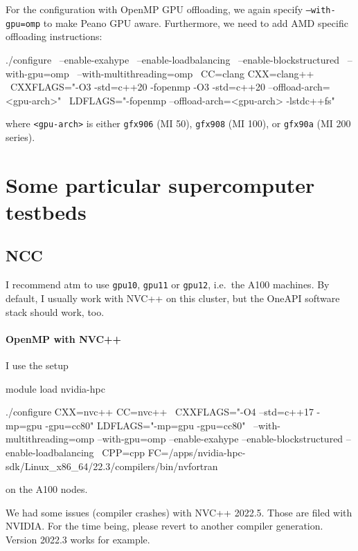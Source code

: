 For the configuration with OpenMP GPU offloading, we again specify \texttt{--with-gpu=omp} to make Peano GPU aware.
Furthermore, we need to add AMD specific offloading instructions:

\begin{bash}
  ./configure \
  --enable-exahype \
  --enable-loadbalancing \
  --enable-blockstructured \
  --with-gpu=omp \
  --with-multithreading=omp \
  CC=clang CXX=clang++ \
  CXXFLAGS="-O3 -std=c++20 -fopenmp -O3 -std=c++20 --offload-arch=<gpu-arch>" \
  LDFLAGS="-fopenmp --offload-arch=<gpu-arch> -lstdc++fs"
\end{bash}

where \texttt{<gpu-arch>} is either \texttt{gfx906} (MI 50), \texttt{gfx908} (MI 100), or \texttt{gfx90a} (MI 200 series).

\section{Some particular supercomputer testbeds}




\subsection{NCC}

I recommend atm to use \texttt{gpu10}, \texttt{gpu11} or \texttt{gpu12}, i.e.~the A100 machines.
By default, I usually work with NVC++ on this cluster, but the OneAPI software stack should work, too.

\paragraph{OpenMP with NVC++}

I use the setup 

\begin{bash}
module load nvidia-hpc

./configure CXX=nvc++ CC=nvc++ \ 
 CXXFLAGS="-O4 --std=c++17 -mp=gpu -gpu=cc80" LDFLAGS="-mp=gpu -gpu=cc80" \ 
 --with-multithreading=omp --with-gpu=omp --enable-exahype --enable-blockstructured --enable-loadbalancing \ 
 CPP=cpp FC=/apps/nvidia-hpc-sdk/Linux_x86_64/22.3/compilers/bin/nvfortran 
\end{bash}

\noindent
on the A100 nodes.

\begin{remark}
 We had some issues (compiler crashes) with NVC++ 2022.5. Those are filed with
 NVIDIA. For the time being, please revert to another compiler generation.
 Version 2022.3 works for example.
\end{remark}


